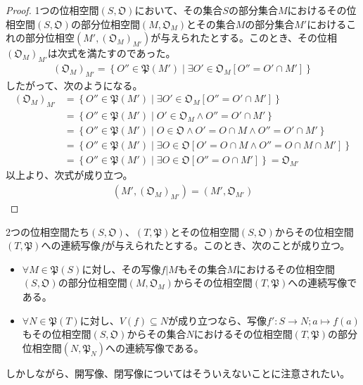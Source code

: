 \documentclass[dvipdfmx]{jsarticle}
\begin{document}
\begin{proof}
1つの位相空間$\left( S,\mathfrak{O} \right)$において、その集合$S$の部分集合$M$におけるその位相空間$\left( S,\mathfrak{O} \right)$の部分位相空間$\left( M,\mathfrak{O}_{M} \right)$とその集合$M$の部分集合$M'$におけるこれの部分位相空$\left( M',\left( \mathfrak{O}_{M} \right)_{M'} \right)$が与えられたとする。このとき、その位相$\left( \mathfrak{O}_{M} \right)_{M'}$は次式を満たすのであった。
\begin{align*}
\left( \mathfrak{O}_{M} \right)_{M'} = \left\{ O''\in \mathfrak{P}\left( M' \right) \middle| \exists O' \in \mathfrak{O}_{M}\left[ O'' = O' \cap M' \right] \right\}
\end{align*}
したがって、次のようになる。
\begin{align*}
\left( \mathfrak{O}_{M} \right)_{M'} &= \left\{ O''\in \mathfrak{P}\left( M' \right) \middle| \exists O' \in \mathfrak{O}_{M}\left[ O'' = O' \cap M' \right] \right\}\\
&= \left\{ O''\in \mathfrak{P}\left( M' \right) \middle| O' \in \mathfrak{O}_{M} \land O'' = O' \cap M' \right\}\\
&= \left\{ O''\in \mathfrak{P}\left( M' \right) \middle| O \in \mathfrak{O \land}O' = O \cap M \land O'' = O' \cap M' \right\}\\
&= \left\{ O''\in \mathfrak{P}\left( M' \right) \middle| \exists O \in \mathfrak{O}\left[ O' = O \cap M \land O'' = O \cap M \cap M' \right] \right\}\\
&= \left\{ O''\in \mathfrak{P}\left( M' \right) \middle| \exists O \in \mathfrak{O}\left[ O'' = O \cap M' \right] \right\} = \mathfrak{O}_{M'}
\end{align*}
以上より、次式が成り立つ。
\begin{align*}
\left( M',\left( \mathfrak{O}_{M} \right)_{M'} \right) = \left( M',\mathfrak{O}_{M'} \right)
\end{align*}
\end{proof}
\begin{thm}\label{8.1.4.14}
2つの位相空間たち$\left( S,\mathfrak{O} \right)$、$\left( T,\mathfrak{P} \right)$とその位相空間$\left( S,\mathfrak{O} \right)$からその位相空間$\left( T,\mathfrak{P} \right)$への連続写像$f$が与えられたとする。このとき、次のことが成り立つ。
\begin{itemize}
\item
  $\forall M \in \mathfrak{P}(S)$に対し、その写像$f|M$もその集合$M$におけるその位相空間$\left( S,\mathfrak{O} \right)$の部分位相空間$\left( M,\mathfrak{O}_{M} \right)$からその位相空間$\left( T,\mathfrak{P} \right)$への連続写像である。
\item
  $\forall N \in \mathfrak{P}(T)$に対し、$V(f) \subseteq N$が成り立つなら、写像$f':S \rightarrow N;a \mapsto f(a)$もその位相空間$\left( S,\mathfrak{O} \right)$からその集合$N$におけるその位相空間$\left( T,\mathfrak{P} \right)$の部分位相空間$\left( N,\mathfrak{P}_{N} \right)$への連続写像である。
\end{itemize}
しかしながら、開写像、閉写像についてはそういえないことに注意されたい。
\end{thm}
\end{document}
